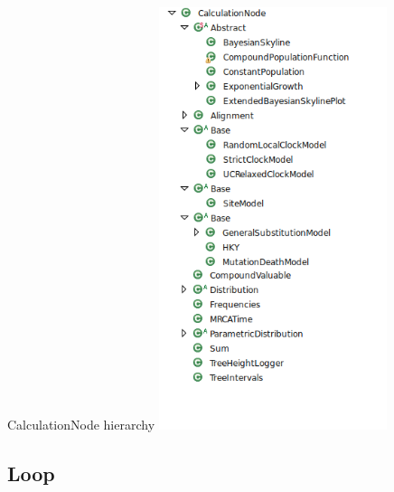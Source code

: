 \documentclass{beamer}
\theoremstyle{definition}
\begin{document}
\begin{frame}[containsverbatim]{CalculationNode hierarchy}
\includegraphics[width=0.5\textwidth]{hierarchy2.png}
\end{frame}


\subsection{Loop}
\end{document}

